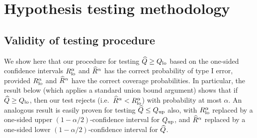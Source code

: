 \section{Hypothesis testing methodology} 

\subsection{Validity of testing procedure} \label{sec:hyp-testing-supplement}



We show here that our procedure for testing $\widehat{Q} \geq Q_{\mathrm{lo}}$ based on the one-sided confidence intervals $R_{\mathrm{lo}}^{\alpha}$ and $\widehat{R}^{\alpha}$ has the correct probability of type I error, provided $R_{\mathrm{lo}}^{\alpha}$ and $\widehat{R}^{\alpha}$ have the correct coverage probabilities.
In particular, the result below (which applies a standard union bound argument) shows that if $\widehat{Q} \geq Q_{\mathrm{lo}}$, then our test rejects (i.e.\ $\widehat{R}^{\alpha} < R_{\mathrm{lo}}^{\alpha}$) with probability at most $\alpha$.
An analogous result is easily proven for testing $\widehat{Q} \leq Q_{\mathrm{up}}$ also, with $R_{\mathrm{lo}}^{\alpha}$ replaced by a one-sided upper $(1-\alpha/2)$-confidence interval for $Q_{\mathrm{up}}$, and $\widehat{R}^{\alpha}$ replaced by a one-sided lower $(1 - \alpha/2)$-confidence interval for $\widehat{Q}$.

